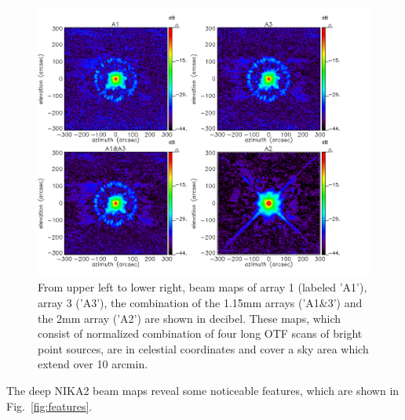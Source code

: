 \begin{figure}
\begin{center}
  \includegraphics[clip, angle=0, scale=0.4]{Figures/Lobe_map_Combo_v2_dB.pdf}
 \caption[Beam pattern.]{From upper left to lower right, beam maps of array 1 (labeled 'A1'), array 3 ('A3'), the combination of the 1.15mm arrays ('A1$\&$3') and the 2mm array ('A2') are shown in decibel. These maps, which consist of normalized combination of four long OTF scans of bright point sources, are in celestial coordinates and cover a sky area which extend over 10 arcmin.}
\label{fig:beam}
\end{center}
\end{figure}


The deep NIKA2 beam maps reveal some noticeable features, which are
shown in Fig.~\ref{fig:features}.

